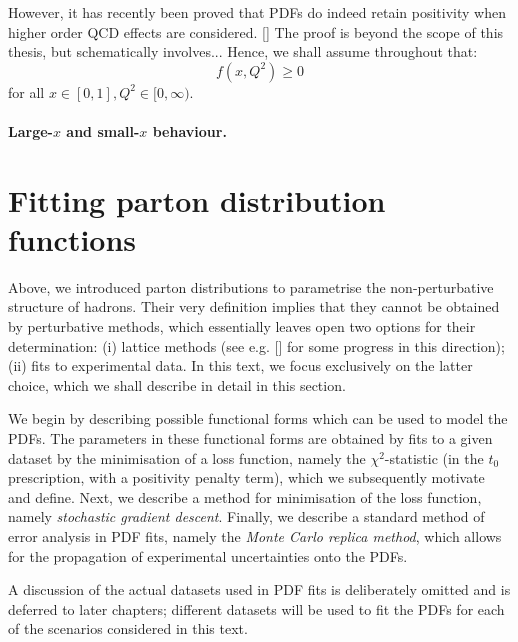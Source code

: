 \documentclass[withindex,glossary]{cam-thesis}
\begin{document}
However, it has recently been proved that PDFs do indeed retain positivity when higher order QCD effects are considered. [] The proof is beyond the scope of this thesis, but schematically involves... Hence, we shall assume throughout that:
\begin{equation}
f(x,Q^2) \geq 0
\end{equation}
for all $x \in [0,1], Q^2 \in [0,\infty)$. 

\paragraph{Large-$x$ and small-$x$ behaviour.}




\newpage
\section{Fitting parton distribution functions}
\label{sec:pdffitting}

Above, we introduced parton distributions to parametrise the non-perturbative structure of hadrons. Their very definition implies that they cannot be obtained by perturbative methods, which essentially leaves open two options for their determination: (i) lattice methods (see e.g. [] for some progress in this direction); (ii) fits to experimental data. In this text, we focus exclusively on the latter choice, which we shall describe in detail in this section.

We begin by describing possible functional forms which can be used to model the PDFs. The parameters in these functional forms are obtained by fits to a given dataset by the minimisation of a loss function, namely the $\chi^2$-statistic (in the $t_0$ prescription, with a positivity penalty term), which we subsequently motivate and define. Next, we describe a method for minimisation of the loss function, namely \textit{stochastic gradient descent}. Finally, we describe a standard method of error analysis in PDF fits, namely the \textit{Monte Carlo replica method}, which allows for the propagation of experimental uncertainties onto the PDFs. 

A discussion of the actual datasets used in PDF fits is deliberately omitted and is deferred to later chapters; different datasets will be used to fit the PDFs for each of the scenarios considered in this text.
\end{document}
